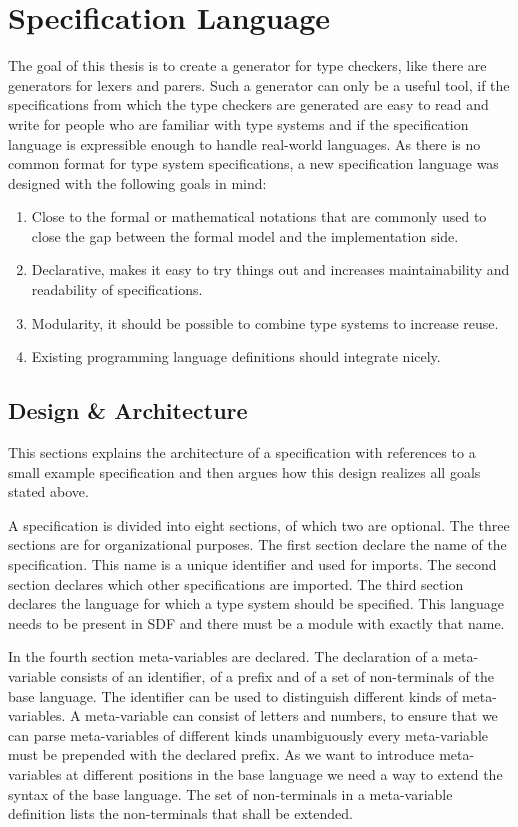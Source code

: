 \chapter{Specification Language}
The goal of this thesis is to create a generator for type checkers,
like there are generators for lexers and parers. Such a generator can
only be a useful tool, if the specifications from which the type
checkers are generated are easy to read and write for people who are
familiar with type systems and if the specification language is
expressible enough to handle real-world languages. As there is no
common format for type system specifications, a new specification
language was designed with the following goals in mind:

\begin{enumerate}
\item Close to the formal or mathematical notations that are commonly
  used to close the gap between the formal model and the
  implementation side.
\item Declarative, makes it easy to try things out and increases
  maintainability and readability of specifications.
\item Modularity, it should be possible to combine type systems to
  increase reuse.
\item Existing programming language definitions should integrate nicely.
\end{enumerate}
\section{Design \& Architecture}
This sections explains the architecture of a specification with
references to a small example specification and then argues how this
design realizes all goals stated above.

A specification is divided into eight sections, of which two are
optional. The three sections are for organizational purposes. The
first section declare the name of the specification. This name is a
unique identifier and used for imports. The second section declares
which other specifications are imported. The third section declares
the language for which a type system should be specified. This
language needs to be present in SDF and there must be a module with
exactly that name. 

In the fourth section meta-variables are declared. The declaration of
a meta-variable consists of an identifier, of a prefix and of a set of
non-terminals of the base language. The identifier can be used to
distinguish different kinds of meta-variables. A meta-variable can consist of letters and numbers, to
ensure that we can parse meta-variables of different kinds
unambiguously every meta-variable must be prepended with the declared
prefix. As we want to introduce meta-variables at different positions
in the base language we need a way to extend the syntax of the base
language. The set of non-terminals in a meta-variable definition lists
the non-terminals that shall be extended.

